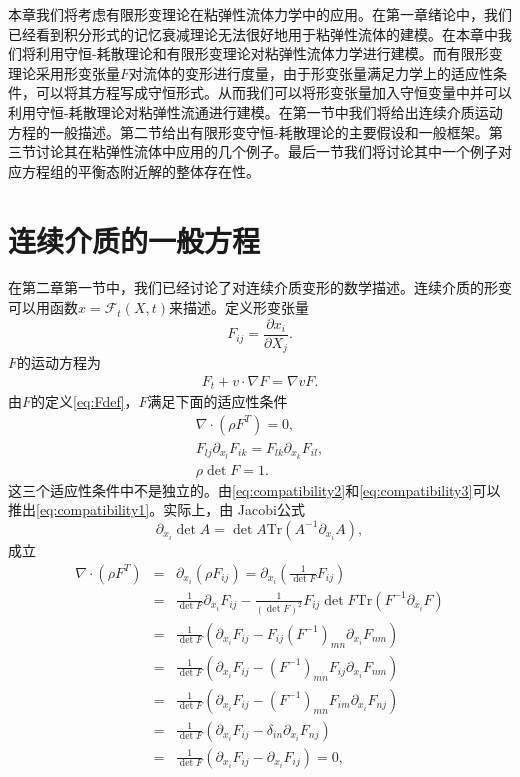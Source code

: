 \documentclass{article}
\begin{document}
本章我们将考虑有限形变理论在粘弹性流体力学中的应用。在第一章绪论中，我们已经看到积分形式的记忆衰减理论无法很好地用于粘弹性流体的建模。在本章中我们将利用守恒-耗散理论和有限形变理论对粘弹性流体力学进行建模。而有限形变理论采用形变张量$F$对流体的变形进行度量，由于形变张量满足力学上的适应性条件，可以将其方程写成守恒形式。从而我们可以将形变张量加入守恒变量中并可以利用守恒-耗散理论对粘弹性流通进行建模。在第一节中我们将给出连续介质运动方程的一般描述。第二节给出有限形变守恒-耗散理论的主要假设和一般框架。第三节讨论其在粘弹性流体中应用的几个例子。最后一节我们将讨论其中一个例子对应方程组的平衡态附近解的整体存在性。

\section{连续介质的一般方程}
在第二章第一节中，我们已经讨论了对连续介质变形的数学描述。连续介质的形变可以用函数$x=\mathcal{F}_t (X,t)$来描述。定义形变张量
\begin{equation*}\label{eq:Fdef}
	F_{ij} = \frac{\partial x_i}{\partial X_j}.
\end{equation*}
$F$的运动方程为
\begin{eqnarray}\label{eq:Feq}
F_t + v \cdot \nabla F = \nabla v F.
\end{eqnarray}
由$F$的定义\eqref{eq:Fdef}，$F$满足下面的适应性条件
\begin{subequations}
\begin{align}
\nabla \cdot (\rho F^T) = 0,\label{eq:compatibility1} \\
 F_{lj} \partial_{x_l} F_{ik} = F_{lk} \partial_{x_k} F_{il} , \label{eq:compatibility2} \\
 \rho \det F = 1. \label{eq:compatibility3} 
\end{align}
\end{subequations}
这三个适应性条件中不是独立的。由\eqref{eq:compatibility2}和\eqref{eq:compatibility3}可以推出\eqref{eq:compatibility1}。实际上，由
Jacobi公式
$$
\partial_{x_i}\det A = \det A \mbox{Tr}(A^{-1} \partial_{x_i} A),
$$
成立
\begin{eqnarray*}
\nabla \cdot (\rho F^T)  & = &\partial_{x_i} ( \rho F_{ij}) = \partial_{x_i} ( \frac{1}{\det F} F_{ij})  \\
&=& \frac{1}{\det F} \partial_{x_i} F_{ij}  - \frac{1}{(\det F)^2} F_{ij} \det F \mbox{Tr}(F^{-1} \partial_{x_i} F) \\
&=&\frac{1}{\det F} (\partial_{x_i} F_{ij} - F_{ij} (F^{-1})_{mn} \partial_{x_i} F_{nm}) \\
&=& \frac{1}{\det F} (\partial_{x_i} F_{ij} - (F^{-1})_{mn} F_{ij} \partial_{x_i} F_{nm}) \\
&=&  \frac{1}{\det F} (\partial_{x_i} F_{ij} - (F^{-1})_{mn} F_{im} \partial_{x_i} F_{nj}) \\
&=&  \frac{1}{\det F} (\partial_{x_i} F_{ij} - \delta_{in} \partial_{x_i} F_{nj}) \\
&=&  \frac{1}{\det F} (\partial_{x_i} F_{ij} - \partial_{x_i} F_{ij}) =0 ,
\end{eqnarray*}
\end{document}
